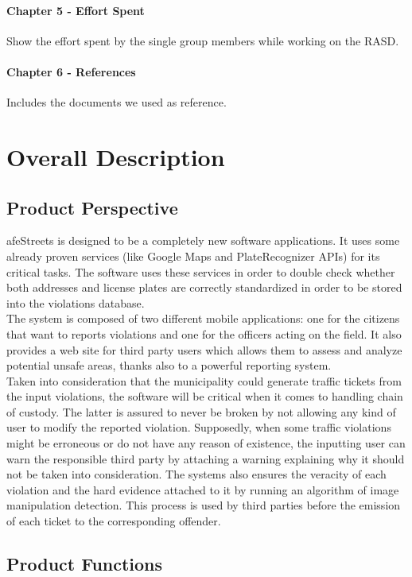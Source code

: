 \documentclass{article}
\begin{document}
\paragraph{Chapter 5 - Effort Spent}
Show the effort spent by the single group members while working on the RASD.
\paragraph{Chapter 6 - References}
Includes the documents we used as reference.
\newpage
\section{Overall Description}
\subsection{Product Perspective}
afeStreets is designed to be a completely new software applications. It uses
some already proven services (like Google Maps and PlateRecognizer APIs) for its
critical tasks. The software uses these services in order to double check
whether both addresses and license plates are correctly standardized in order to
be stored into the violations database.\\
The system is composed of two different mobile applications: one for the
citizens that want to reports violations and one for the officers acting on the
field. It also provides a web site for third party users which allows them to
assess and analyze potential unsafe areas, thanks also to a powerful reporting
system.\\
Taken into consideration that the municipality could generate traffic tickets
from the input violations, the software will be critical when it comes to
handling chain of custody. The latter is assured to never be broken by not
allowing any kind of user to modify the reported violation. Supposedly, when
some traffic violations might be erroneous or do not have any reason of
existence, the inputting user can warn the responsible third party by attaching
a warning explaining why it should not be taken into consideration. The systems
also ensures the veracity of each violation and the hard evidence attached to it
by running an algorithm of image manipulation detection. This process is used by
third parties before the emission of each ticket to the corresponding offender.

\subsection{Product Functions}
\end{document}
